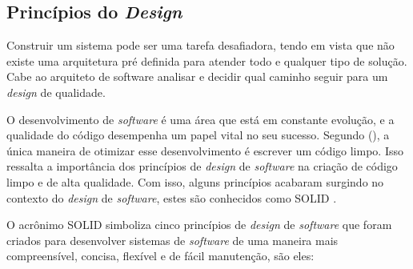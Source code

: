 \subsection{Princípios do \textit{Design}}

Construir um sistema pode ser uma tarefa desafiadora, tendo em vista que não existe uma arquitetura 
pré definida para atender todo e qualquer tipo de solução. Cabe ao arquiteto de software analisar 
e decidir qual caminho seguir para um \textit{design} de qualidade.

O desenvolvimento de \textit{software} é uma área que está em constante evolução, e a qualidade do 
código desempenha um papel vital no seu sucesso. Segundo  (\citeyear{robert2019clean}), a única maneira de 
otimizar esse desenvolvimento é escrever um código limpo. Isso ressalta a importância dos princípios de \textit{design} de 
\textit{software} na criação de código limpo e de alta qualidade. Com isso, alguns princípios acabaram surgindo 
no contexto do \textit{design} de \textit{software}, estes são conhecidos como SOLID \cite{robert2019clean}.

O acrônimo SOLID simboliza cinco princípios de \textit{design} de \textit{software} que foram criados 
para desenvolver sistemas de \textit{software} de uma maneira mais compreensível, concisa, flexível e 
de fácil manutenção, são eles:

